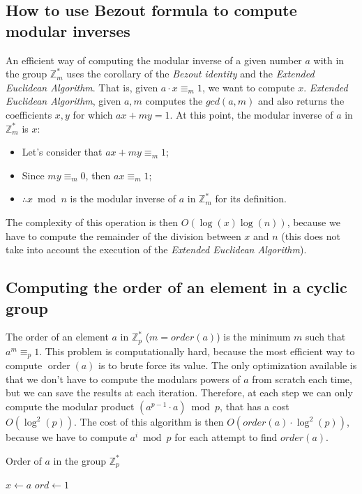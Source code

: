 \subsection{How to use Bezout formula to compute modular inverses}
An efficient way of computing the modular inverse of a given number $a$ with in the group $\mathbb{Z}_{m}^{*}$ uses the corollary of the \emph{Bezout identity} and the \emph{Extended Euclidean Algorithm}.\newline
That is, given $a \cdot x \equiv_{m} 1$, we want to compute $x$.\newline
\emph{Extended Euclidean Algorithm}, given $a, m$ computes the $gcd(a,m)$ and also returns the coefficients $x,y$ for which $ax + my = 1$. \newline
At this point, the modular inverse of $a$ in $\mathbb{Z}_{m}^{*}$ is $x$:
\begin{itemize}
    \item Let's consider that $ax + my \equiv_{m} 1$;
    \item Since $my \equiv_{m} 0$, then $ax \equiv_{m} 1$;
    \item $\therefore x \bmod n$ is the modular inverse of $a$ in $\mathbb{Z}_{m}^{*}$ for its definition.
\end{itemize}
The complexity of this operation is then $O(\operatorname{log}(x)\operatorname{log}(n))$, because we have to compute the remainder of the division between $x$ and $n$ (this does not take into account the execution of the \emph{Extended Euclidean Algorithm}).

\subsection{Computing the order of an element in a cyclic group}
The order of an element $a$ in $\mathbb{Z}_{p}^{*}$ ($m = order(a)$) is the minimum $m$ such that $a^{m} \equiv_{p} 1$.\newline
This problem is computationally hard, because the most efficient way to compute $\operatorname{order}(a)$ is to brute force its value.\newline
The only optimization available is that we don't have to compute the modulars powers of $a$ from scratch each time, but we can save the results at each iteration. \newline
Therefore, at each step we can only compute the modular product $(a^{p-1} \cdot a) \bmod p$, that has a cost $O(\operatorname{log}^{2}(p))$.
The cost of this algorithm is then $O(order(a) \cdot \operatorname{log}^{2}(p))$, because we have to compute $a^{i} \bmod p$ for each attempt to find $order(a)$.
\begin{algorithm}
\caption{Order of $a$ in the group $\mathbb{Z}_{p}^{*}$}\label{alg:OrdElemGrp}
$x \gets a$\;
$ord \gets 1$\;
\end{algorithm}

